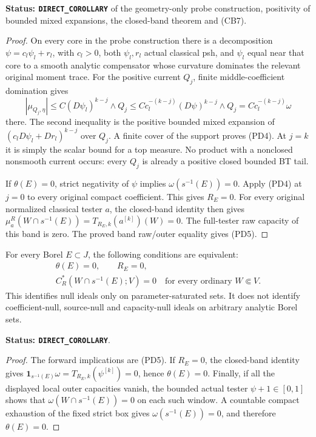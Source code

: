 \noindent\textbf{Status: \texttt{DIRECT\_COROLLARY}} of the
geometry-only probe construction, positivity of bounded mixed
expansions, the closed-band theorem and (CB7).

\begin{proof}
On every core in the probe construction there is a decomposition
$\psi=c_l\psi_l+r_l$, with $c_l>0$, both $\psi_l,r_l$ actual
classical psh, and $\psi_l$ equal near that core to a smooth
analytic compensator whose curvature dominates the relevant
original moment trace. For the positive current $Q_j$, finite
middle-coefficient domination gives
\[
 |\mu_{Q_j,\eta}|
       \leq C(D\psi_l)^{k-j}\wedge Q_j
       \leq Cc_l^{-(k-j)}(D\psi)^{k-j}\wedge Q_j
       = Cc_l^{-(k-j)}\omega
\]
there. The second inequality is the positive bounded mixed
expansion of $(c_lD\psi_l+Dr_l)^{k-j}$ over $Q_j$.
A finite cover of the support proves (PD4). At $j=k$ it
is simply the scalar bound for a top measure. No product
with a nonclosed nonsmooth current occurs: every $Q_j$ is
already a positive closed bounded BT tail.

If $\theta(E)=0$, strict negativity of $\psi$ implies
$\omega(s^{-1}(E))=0$. Apply (PD4) at $j=0$ to every
original compact coefficient. This gives $R_E=0$.
For every original normalized classical tester $a$, the
closed-band identity then gives
$\mu_a^R(W\cap s^{-1}(E))=T_{R_E,k}(a^{[k]})(W)=0$.
The full-tester raw capacity of this band is zero.
The proved band raw/outer equality gives (PD5).
\end{proof}

\begin{corollary}
\label{cor:r12-parameter-exact-null-ideal}
For every Borel $E\subset J$, the following conditions are equivalent:
\[
 \begin{gathered}
 \theta(E)=0,\qquad R_E=0,\\
 C_R^*(W\cap s^{-1}(E);V)=0
       \quad\text{for every ordinary }W\Subset V.
 \end{gathered}
 \tag{PD5a}
\]
This identifies null ideals only on parameter-saturated sets.
It does not identify coefficient-null, source-null and capacity-null
ideals on arbitrary analytic Borel sets.
\end{corollary}

\noindent\textbf{Status: \texttt{DIRECT\_COROLLARY}}.

\begin{proof}
The forward implications are (PD5). If $R_E=0$, the closed-band
identity gives $\mathbf1_{s^{-1}(E)}\omega=T_{R_E,k}(\psi^{[k]})=0$,
hence $\theta(E)=0$. Finally, if all the displayed local outer
capacities vanish, the bounded actual tester $\psi+1\in[0,1]$
shows that $\omega(W\cap s^{-1}(E))=0$ on each such window.
A countable compact exhaustion of the fixed strict box gives
$\omega(s^{-1}(E))=0$, and therefore $\theta(E)=0$.
\end{proof}

